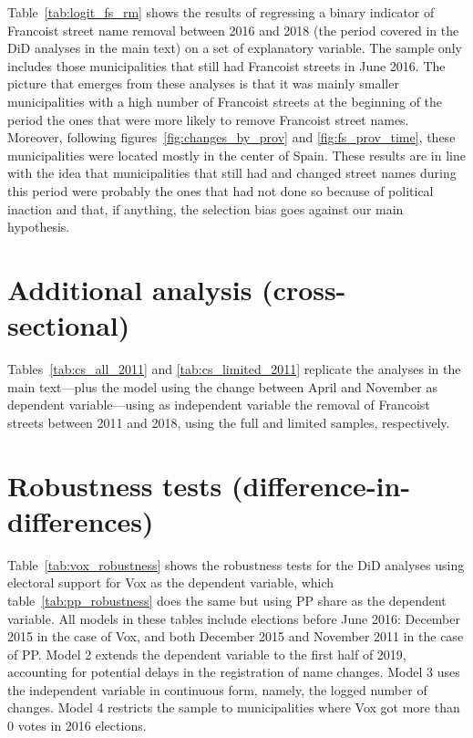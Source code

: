 \documentclass[12pt, titlepage]{article}
\begin{document}
Table~\ref{tab:logit_fs_rm} shows the results of regressing a binary indicator of Francoist street name removal between 2016 and 2018 (the period covered in the DiD analyses in the main text) on a set of explanatory variable.
The sample only includes those municipalities that still had Francoist streets in June 2016.
The picture that emerges from these analyses is that it was mainly smaller municipalities with a high number of Francoist streets at the beginning of the period the ones that were more likely to remove Francoist street names.
Moreover, following figures~\ref{fig:changes_by_prov} and \ref{fig:fs_prov_time}, these municipalities were located mostly in the center of Spain.
These results are in line with the idea that municipalities that still had and changed street names during this period were probably the ones that had not done so because of political inaction and that, if anything, the selection bias goes against our main hypothesis.



\section{Additional analysis (cross-sectional)}



Tables~\ref{tab:cs_all_2011} and \ref{tab:cs_limited_2011} replicate the analyses in the main text---plus the model using the change between April and November as dependent variable---using as independent variable the removal of Francoist streets between 2011 and 2018, using the full and limited samples, respectively.




\section{Robustness tests (difference-in-differences)}

Table~\ref{tab:vox_robustness} shows the robustness tests for the DiD analyses using electoral support for Vox as the dependent variable, which table~\ref{tab:pp_robustness} does the same but using PP share as the dependent variable.
All models in these tables include elections before June 2016: December 2015 in the case of Vox, and both December 2015 and November 2011 in the case of PP.
Model 2 extends the dependent variable to the first half of 2019, accounting for potential delays in the registration of name changes.
Model 3 uses the independent variable in continuous form, namely, the logged number of changes.
Model 4 restricts the sample to municipalities where Vox got more than 0 votes in 2016 elections.



\end{document}
